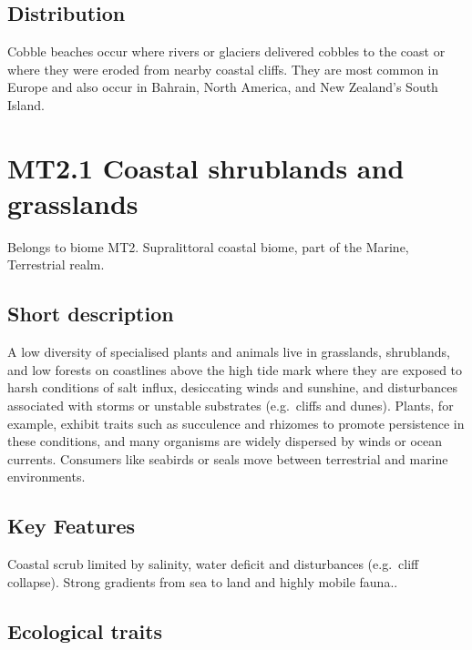 \documentclass[
  letterpaper,
  DIV=11,
  numbers=noendperiod]{scrartcl}
\begin{document}
\subsection{Distribution}\label{distribution-55}

Cobble beaches occur where rivers or glaciers delivered cobbles to the
coast or where they were eroded from nearby coastal cliffs. They are
most common in Europe and also occur in Bahrain, North America, and New
Zealand's South Island.

\section{MT2.1 Coastal shrublands and
grasslands}\label{mt2.1-coastal-shrublands-and-grasslands}

Belongs to biome MT2. Supralittoral coastal biome, part of the Marine,
Terrestrial realm.

\subsection{Short description}\label{short-description-56}

A low diversity of specialised plants and animals live in grasslands,
shrublands, and low forests on coastlines above the high tide mark where
they are exposed to harsh conditions of salt influx, desiccating winds
and sunshine, and disturbances associated with storms or unstable
substrates (e.g.~cliffs and dunes). Plants, for example, exhibit traits
such as succulence and rhizomes to promote persistence in these
conditions, and many organisms are widely dispersed by winds or ocean
currents. Consumers like seabirds or seals move between terrestrial and
marine environments.

\subsection{Key Features}\label{key-features-56}

Coastal scrub limited by salinity, water deficit and disturbances
(e.g.~cliff collapse). Strong gradients from sea to land and highly
mobile fauna..

\subsection{Ecological traits}\label{ecological-traits-56}
\end{document}
